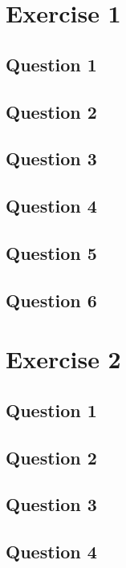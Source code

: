 \documentclass[10pt,a4paper]{article}
\begin{document}


\section{Exercise 1}
\subsection{Question 1}
\subsection{Question 2}
\subsection{Question 3}
\subsection{Question 4}
\subsection{Question 5}
\subsection{Question 6}

\section{Exercise 2}
\subsection{Question 1}
\subsection{Question 2}
\subsection{Question 3}
\subsection{Question 4}
\end{document}
